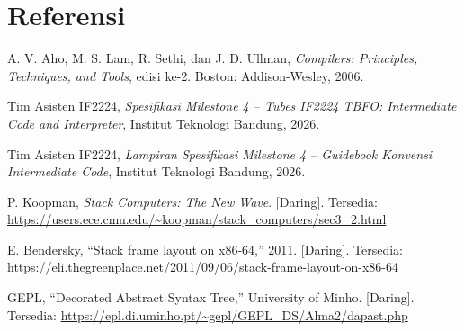 \section{Referensi}

\begin{enumerate}[label={[\arabic*]}]
  \item A. V. Aho, M. S. Lam, R. Sethi, dan J. D. Ullman, \textit{Compilers:
        Principles, Techniques, and Tools}, edisi ke-2. Boston: Addison-Wesley,
        2006.
  \item Tim Asisten IF2224, \textit{Spesifikasi Milestone 4 -- Tubes IF2224 TBFO:
        Intermediate Code and Interpreter}, Institut Teknologi Bandung, 2026.
  \item Tim Asisten IF2224, \textit{Lampiran Spesifikasi Milestone 4 -- Guidebook
        Konvensi Intermediate Code}, Institut Teknologi Bandung, 2026.
  \item P. Koopman, \textit{Stack Computers: The New Wave}. [Daring]. Tersedia:
        \url{https://users.ece.cmu.edu/~koopman/stack_computers/sec3_2.html}
  \item E. Bendersky, ``Stack frame layout on x86-64,'' 2011. [Daring]. Tersedia:
        \url{https://eli.thegreenplace.net/2011/09/06/stack-frame-layout-on-x86-64}
  \item GEPL, ``Decorated Abstract Syntax Tree,'' University of Minho. [Daring].
        Tersedia: \url{https://epl.di.uminho.pt/~gepl/GEPL_DS/Alma2/dapast.php}
\end{enumerate}
